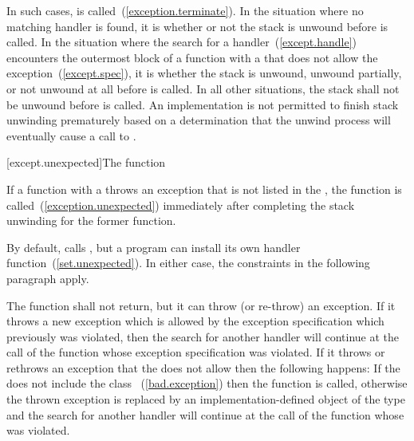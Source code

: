 \exitnote

\pnum
{}%
In such cases,
is called~(\ref{exception.terminate}).
In the situation where no matching handler is found, it is
 whether or not the
stack is unwound
before
is called.
In the situation where the search for a handler~(\ref{except.handle}) encounters the
outermost block of a function with a 
that does not allow the exception~(\ref{except.spec}), it is
whether the stack is unwound, unwound partially, or not unwound at all
before  is called.
In all other situations, the stack shall not be unwound before
is called.
An implementation is not permitted to finish stack unwinding
prematurely based on a determination that the unwind process
will eventually cause a call to
.

[except.unexpected]{The  function}

\pnum
{}%
If a function with
a 
throws an exception that is not listed in the
,
the function
is called~(\ref{exception.unexpected}) immediately after completing
the stack unwinding for the former function.

\pnum
\enternote By default,  calls , but a
program can install its own handler function~(\ref{set.unexpected}). In either case, the
constraints in the following paragraph apply. \exitnote

\pnum
The
function shall not return, but it can throw (or re-throw) an exception.
If it throws a new exception which is allowed by the exception specification
which previously was violated, then the search for another handler
will continue at the call of the function whose exception specification was violated.
If it throws or rethrows an exception that the
does not allow
then the following happens:
%
If the
does not include the class
~(\ref{bad.exception})
then the function
is called, otherwise the thrown exception is replaced by an
implementation-defined object of the type
and the search for another handler will continue at the call of the function
whose
was violated.

